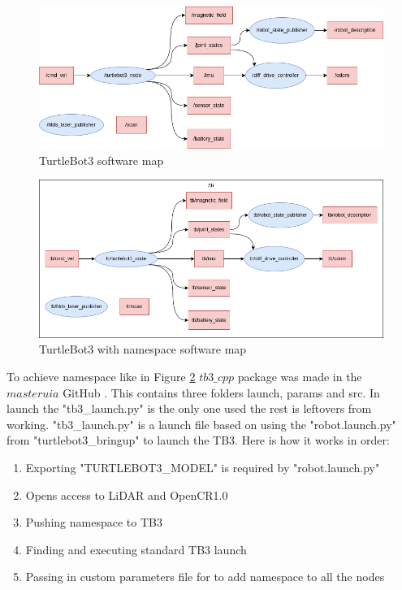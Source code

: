 \begin{figure}[H]
    \centering
    \includegraphics[width = 1\textwidth]{Figures/drawio/TB3_rqt.drawio.png}
    \caption{TurtleBot3 software map}
    \label{fig:TB3SW}
\end{figure}
\begin{figure}[H]
    \centering
    \includegraphics[width = 1\textwidth]{Figures/drawio/TB3_ns_rqt.drawio.png}
    \caption{TurtleBot3 with namespace software map}
    \label{fig:TB3nsSW}
\end{figure}

To achieve namespace like in Figure \ref{fig:TB3nsSW} $tb3\_cpp$ package was made in the $masteruia$ GitHub \cite{masteruia}. This contains three folders launch, params and src. In launch the "tb3\_launch.py" is the only one used the rest is leftovers from working. "tb3\_launch.py" is  a launch file based on using the "robot.launch.py" from "turtlebot3\_bringup" \cite{turtlebot3galactic} to launch the TB3. Here is how it works in order: 
\begin{enumerate}
\item Exporting "TURTLEBOT3\_MODEL" is required by "robot.launch.py" 
\item Opens access to LiDAR and OpenCR1.0 
\item Pushing namespace to TB3 
\item Finding and executing standard TB3 launch
\item Passing in custom parameters file for to add namespace to all the nodes 
\end{enumerate}  

